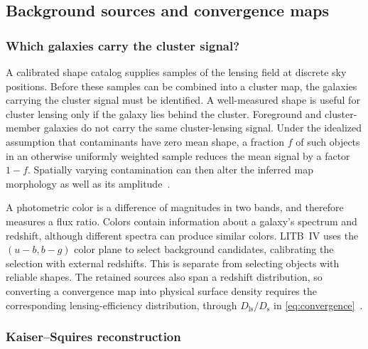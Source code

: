 \subsection{Background sources and convergence maps}
\label{sec:maps}

\subsubsection{Which galaxies carry the cluster signal?}

A calibrated shape catalog supplies samples of the lensing field at discrete sky positions. Before these samples can be combined into a cluster map, the galaxies carrying the cluster signal must be identified. A well-measured shape is useful for cluster lensing only if the galaxy lies behind the cluster. Foreground and cluster-member galaxies do not carry the same cluster-lensing signal. Under the idealized assumption that contaminants have zero mean shape, a fraction $f$ of such objects in an otherwise uniformly weighted sample reduces the mean signal by a factor $1-f$. Spatially varying contamination can then alter the inferred map morphology as well as its amplitude~\cite{schneider_weak_2006,mandelbaum_weak_2018}.

A photometric color is a difference of magnitudes in two bands, and therefore measures a flux ratio. Colors contain information about a galaxy's spectrum and redshift, although different spectra can produce similar colors. LITB~IV uses the $(u-b,b-g)$ color plane to select background candidates, calibrating the selection with external redshifts. This is separate from selecting objects with reliable shapes. The retained sources also span a redshift distribution, so converting a convergence map into physical surface density requires the corresponding lensing-efficiency distribution, through $D_{\mathrm{ls}}/D_{\mathrm{s}}$ in \cref{eq:convergence}~\cite{saha_lensing_2026,schneider_weak_2006}.

\subsubsection{Kaiser--Squires reconstruction}


